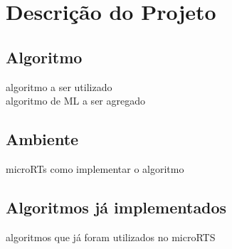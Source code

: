 \chapter{\label{chap:descr}Descrição do Projeto}

\section{Algoritmo}
algoritmo a ser utilizado \\
algoritmo de ML a ser agregado

\section{Ambiente}

microRTs como implementar o algoritmo

\section{Algoritmos já implementados}

algoritmos que já foram utilizados no microRTS

